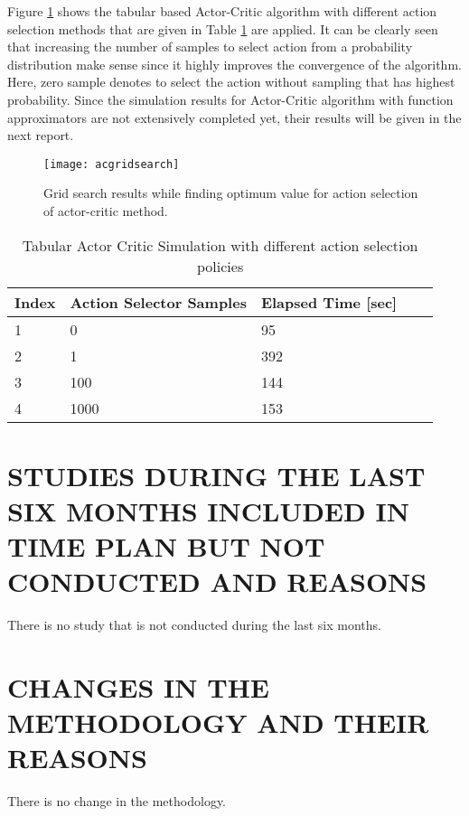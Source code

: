 \documentclass{ituphdreport}
\begin{document}
Figure \ref{fig:acgridsearch} shows the tabular based Actor-Critic algorithm with different action selection methods that are given in Table \ref{table:actabularparams} are applied. It can be clearly seen that increasing the number of samples to select action from a probability distribution make sense since it highly improves the convergence of the algorithm. Here, zero sample denotes to select the action without sampling that has highest probability. Since the simulation results for Actor-Critic algorithm with function approximators are not extensively completed yet, their results will be given in the next report.
 
\begin{figure}[H]
	\begin{center}
		\texttt{[image: acgridsearch]}
	\end{center}
	\caption{Grid search results while finding optimum value for action selection of actor-critic method.
		\label{fig:acgridsearch}}
\end{figure}

\begin{table}[]
	\begin{center}
		\begin{tabular}{lllll}
			Index &	Action Selector Samples	& Elapsed Time [sec] \\
			\hline
			1	& 0		&  95 \\
			2	& 1		& 392 \\
			3	& 100	& 144 \\
			4	& 1000	& 153 
		\end{tabular}
		\caption{Tabular Actor Critic Simulation with different action selection policies
			\label{table:actabularparams}}
	\end{center}
\end{table}

\section{STUDIES DURING THE LAST SIX MONTHS INCLUDED IN TIME PLAN BUT NOT CONDUCTED AND REASONS}
There is no study that is not conducted during the last six months. 

\section{CHANGES IN THE METHODOLOGY AND THEIR REASONS}
There is no change in the methodology.
\end{document}
